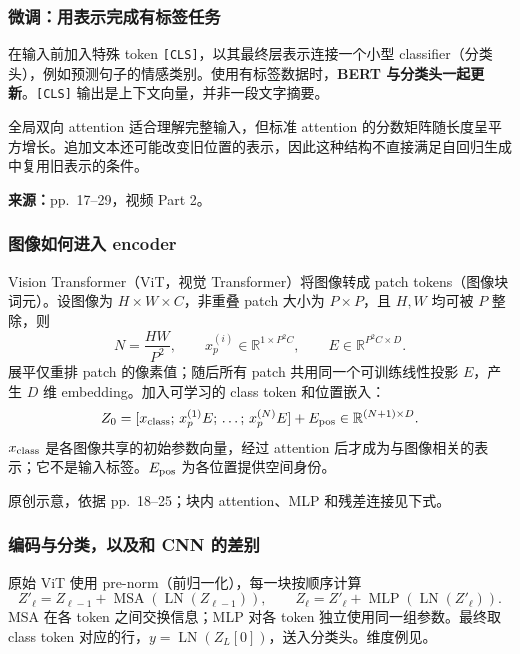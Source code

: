 \subsubsection{微调：用表示完成有标签任务}

在输入前加入特殊 token \texttt{[CLS]}，以其最终层表示连接一个小型 classifier（分类头），例如预测句子的情感类别。使用有标签数据时，\textbf{BERT 与分类头一起更新}。\texttt{[CLS]} 输出是上下文向量，并非一段文字摘要。

全局双向 attention 适合理解完整输入，但标准 attention 的分数矩阵随长度呈平方增长。追加文本还可能改变旧位置的表示，因此这种结构不直接满足自回归生成中复用旧表示的条件。


\textbf{来源：}pp.~17--29，视频 Part 2。

\subsubsection{图像如何进入 encoder}

Vision Transformer（ViT，视觉 Transformer）将图像转成 patch tokens（图像块词元）。设图像为 $H\times W\times C$，非重叠 patch 大小为 $P\times P$，且 $H,W$ 均可被 $P$ 整除，则
\[
 N=\frac{HW}{P^2},\qquad x_p^{(i)}\in\mathbb R^{1\times P^2C},\qquad
 E\in\mathbb R^{P^2C\times D}.
\]
展平仅重排 patch 的像素值；随后所有 patch 共用同一个可训练线性投影 $E$，产生 $D$ 维 embedding。加入可学习的 class token 和位置嵌入：
\[
 Z_0=[x_{\rm class};\,x_p^{(1)}E;\,\ldots;\,x_p^{(N)}E]+E_{\rm pos}
 \in\mathbb R^{(N+1)\times D}.
\]
$x_{\rm class}$ 是各图像共享的初始参数向量，经过 attention 后才成为与图像相关的表示；它不是输入标签。$E_{\rm pos}$ 为各位置提供空间身份。

\begin{center}

\end{center}
{\small 原创示意，依据 pp.~18--25；块内 attention、MLP 和残差连接见下式。}

\subsubsection{编码与分类，以及和 CNN 的差别}

原始 ViT 使用 pre-norm（前归一化），每一块按顺序计算
\[
 Z'_\ell=Z_{\ell-1}+\operatorname{MSA}(\operatorname{LN}(Z_{\ell-1})),\qquad
 Z_\ell=Z'_\ell+\operatorname{MLP}(\operatorname{LN}(Z'_\ell)).
\]
MSA 在各 token 之间交换信息；MLP 对各 token 独立使用同一组参数。最终取 class token 对应的行，$y=\operatorname{LN}(Z_L[0])$，送入分类头。维度例见。

